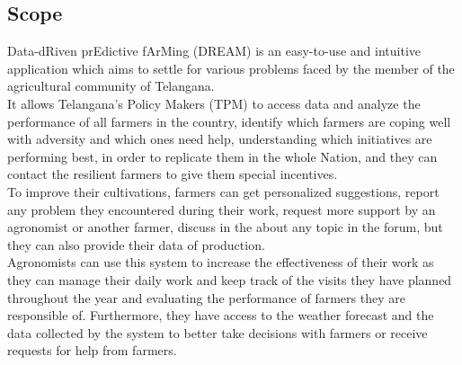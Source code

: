 \subsection{Scope}
Data-dRiven prEdictive fArMing (DREAM) is an easy-to-use and intuitive application which aims to settle for various problems faced by the member of the agricultural community of Telangana.\\

It allows Telangana's Policy Makers (TPM) to access data and analyze the performance of all farmers in the country, identify which farmers are coping well with adversity and which ones need help, understanding which initiatives are performing best, in order to replicate them in the whole Nation, and they can contact the resilient farmers to give them special incentives.\\
To improve their cultivations, farmers can get personalized suggestions, report any problem they encountered during their work, request more support by an agronomist or another farmer, discuss in the about any topic in the forum, but they can also provide their data of production.\\
Agronomists can use this system to increase the effectiveness of their work as they can manage their daily work and keep track of the visits they have planned throughout the year and evaluating the performance of farmers they are responsible of. Furthermore, they have access to the weather forecast and the data collected by the system to better take decisions with farmers or receive requests for help from farmers.

